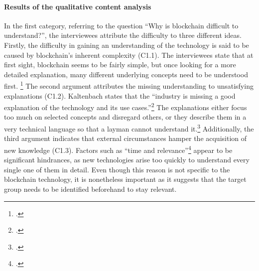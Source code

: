 \paragraph{Results of the qualitative content analysis} In the first category, referring to the question \enquote{Why is blockchain difficult to understand?}, the interviewees attribute the difficulty to three different ideas. Firstly, the difficulty in gaining an understanding of the technology is said to be caused by blockchain's inherent complexity (C1.1). The interviewees state that at first sight, blockchain seems to be fairly simple, but once looking for a more detailed explanation, many different underlying concepts need to be understood first. \footcites[Cf.][P73, P74, P75]{DanielKaltenbach_Interview}[cf.][P113]{RalphBeckmann_Interview} The second argument attributes the missing understanding to unsatisfying explanations (C1.2). Kaltenbach states that the \enquote{industry is missing a good explanation of the technology and its use cases.}\footcite[][P5]{DanielKaltenbach_Interview} The explanations either focus too much on selected concepts and disregard others, or they describe them in a very technical language so that a layman cannot understand it.\footcites[Cf.][P7, P8, P19, P20 ]{DanielKaltenbach_Interview}[cf.][P131]{RalphBeckmann_Interview} Additionally, the third argument indicates that external circumstances hamper the acquisition of new knowledge (C1.3). Factors such as \enquote{time and relevance}\footcite[][P9]{DanielKaltenbach_Interview} appear to be significant hindrances, as new technologies arise too quickly to understand every single one of them in detail. Even though this reason is not specific to the blockchain technology, it is nonetheless important as it suggests that the target group needs to be identified beforehand to stay relevant.

